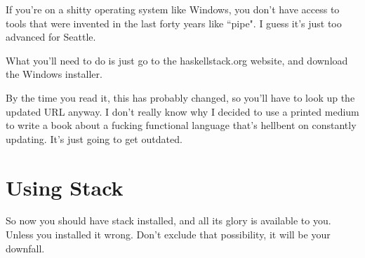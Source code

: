 If you're on a shitty operating system like Windows, you don't have access to tools that were invented in the last forty years like ``pipe".  I guess it's just too advanced for Seattle. 

What you'll need to do is just go to the haskellstack.org website, and download the Windows installer. 

By the time you read it, this has probably changed, so you'll have to look up the updated URL anyway.  I don't really know why I decided to use a printed medium to write a book about a fucking functional language that's hellbent on constantly updating. It's just going to get outdated.

\section{Using Stack}
So now you should have stack installed, and all its glory is available to you.  Unless you installed it wrong.  Don't exclude that possibility, it will be your downfall.  



